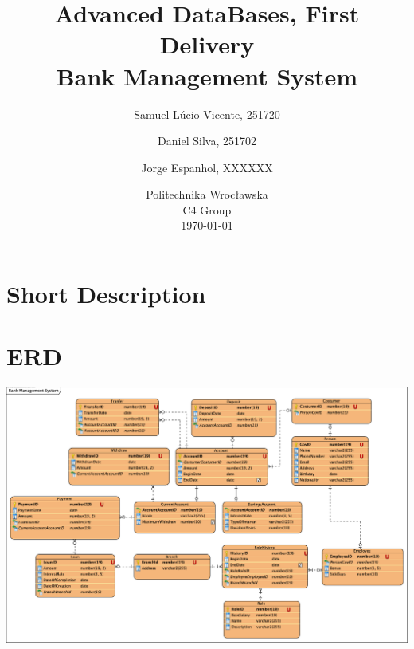 \documentclass[a4paper, 10pt]{article}
\begin{document}
\title{Advanced DataBases, First Delivery\\
  \huge Bank Management System}
\author{
  Samuel Lúcio Vicente, 251720
  \and
  Daniel Silva, 251702
  \and
  Jorge Espanhol, XXXXXX
}

\date{Politechnika Wrocławska\\C4 Group\\\today}

\maketitle


\section{Short Description}


\section{ERD}
\includegraphics[width=\textwidth,height=\textheight,keepaspectratio]{bms}
\end{document}
